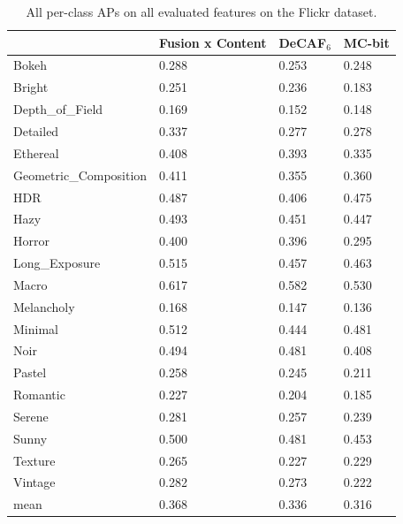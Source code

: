 \begin{table}[ht!]
\caption{
    All per-class APs on all evaluated features on the Flickr dataset.
}\label{tab:flickr_ap_table}
\vspace{1em}
\centering
\begin{tabular}{llll}
\toprule
{}                     & Fusion x Content & DeCAF$_6$ & MC-bit \\
\midrule
Bokeh                  & 0.288            & 0.253     & 0.248 \\
Bright                 & 0.251            & 0.236     & 0.183 \\
Depth\_of\_Field       & 0.169            & 0.152     & 0.148 \\
Detailed               & 0.337            & 0.277     & 0.278 \\
Ethereal               & 0.408            & 0.393     & 0.335 \\
Geometric\_Composition & 0.411            & 0.355     & 0.360 \\
HDR                    & 0.487            & 0.406     & 0.475 \\
Hazy                   & 0.493            & 0.451     & 0.447 \\
Horror                 & 0.400            & 0.396     & 0.295 \\
Long\_Exposure         & 0.515            & 0.457     & 0.463 \\
Macro                  & 0.617            & 0.582     & 0.530 \\
Melancholy             & 0.168            & 0.147     & 0.136 \\
Minimal                & 0.512            & 0.444     & 0.481 \\
Noir                   & 0.494            & 0.481     & 0.408 \\
Pastel                 & 0.258            & 0.245     & 0.211 \\
Romantic               & 0.227            & 0.204     & 0.185 \\
Serene                 & 0.281            & 0.257     & 0.239 \\
Sunny                  & 0.500            & 0.481     & 0.453 \\
Texture                & 0.265            & 0.227     & 0.229 \\
Vintage                & 0.282            & 0.273     & 0.222 \\
\midrule
mean                   & 0.368            & 0.336     & 0.316 \\
\bottomrule
\end{tabular}

\end{table}

